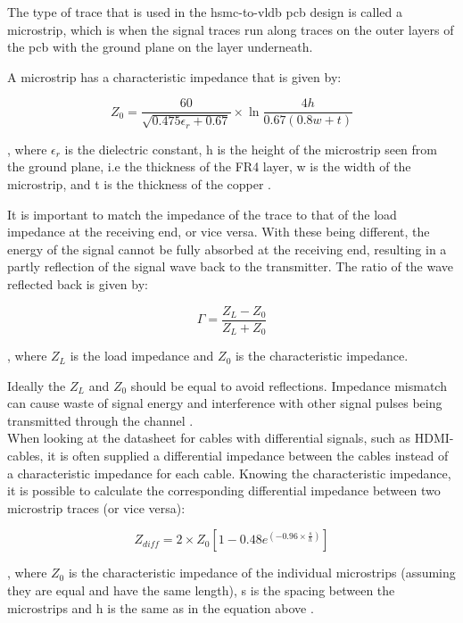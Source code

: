 \documentclass[main.tex]{subfiles}
\begin{document}
The type of trace that is used in the \gls{hsmc}-to-\gls{vldb} \gls{pcb} design is called a microstrip, which is when the signal traces run along traces on the outer layers of the \gls{pcb} with the ground plane on the layer underneath. 

A microstrip has a characteristic impedance that is given by:

\begin{equation}
    Z_0 = \frac{60}{\sqrt{0.475\epsilon_r + 0.67}} \times \ln{\frac{4h}{0.67(0.8w + t)}}
\end{equation}

, where $\epsilon_r$ is the dielectric constant, h is the height of the microstrip seen from the ground plane, i.e the thickness of the FR4 layer, w is the width of the microstrip, and t is the thickness of the copper \cite{weste11}.

It is important to match the impedance of the trace to that of the load impedance at the receiving end, or vice versa. With these being different, the energy of the signal cannot be fully absorbed at the receiving end, resulting in a partly reflection of the signal wave back to the transmitter. The ratio of the wave reflected back is given by:

\begin{equation}
\Gamma = \frac{Z_L - Z_0}{Z_L + Z_0}	
\end{equation}

, where $Z_L$ is the load impedance and $Z_0$ is the characteristic impedance.

Ideally the $Z_L$ and $Z_0$ should be equal to avoid reflections. Impedance mismatch can cause waste of signal energy and interference with other signal pulses being transmitted through the channel \cite{weste11}. \\

When looking at the datasheet for cables with differential signals, such as HDMI-cables, it is often supplied a differential impedance between the cables instead of a characteristic impedance for each cable. Knowing the characteristic impedance, it is possible to calculate the corresponding differential impedance between two microstrip traces (or vice versa):

\begin{equation}
    Z_{diff} = 2 \times Z_0 [1 - 0.48 e^{(-0.96 \times \frac{s}{h})}]
\end{equation}

, where $Z_0$ is the characteristic impedance of the individual microstrips (assuming they are equal and have the same length), s is the spacing between the microstrips and h is the same as in the equation above \cite{douglas98}.
\end{document}
